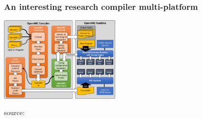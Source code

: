 \begin{frame}
  \frametitle{An interesting research compiler multi-platform}

  \begin{center}
    \includegraphics[width=6cm]{doc/perf_portability/openarc_all}
  \end{center}

  {\small source: }

\end{frame}
